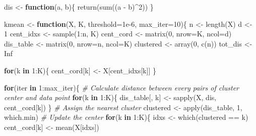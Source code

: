 \documentclass[
]{article}
\newenvironment{Shaded}{\begin{snugshade}}{\end{snugshade}}
\newcommand{\AttributeTok}[1]{\textcolor[rgb]{0.77,0.63,0.00}{#1}}
\newcommand{\CommentTok}[1]{\textcolor[rgb]{0.56,0.35,0.01}{\textit{#1}}}
\newcommand{\ConstantTok}[1]{\textcolor[rgb]{0.00,0.00,0.00}{#1}}
\newcommand{\ControlFlowTok}[1]{\textcolor[rgb]{0.13,0.29,0.53}{\textbf{#1}}}
\newcommand{\DecValTok}[1]{\textcolor[rgb]{0.00,0.00,0.81}{#1}}
\newcommand{\FloatTok}[1]{\textcolor[rgb]{0.00,0.00,0.81}{#1}}
\newcommand{\FunctionTok}[1]{\textcolor[rgb]{0.00,0.00,0.00}{#1}}
\newcommand{\NormalTok}[1]{#1}
\newcommand{\OtherTok}[1]{\textcolor[rgb]{0.56,0.35,0.01}{#1}}
\newcommand{\SpecialCharTok}[1]{\textcolor[rgb]{0.00,0.00,0.00}{#1}}
\begin{document}
\begin{Shaded}
\begin{Highlighting}[]
\NormalTok{dis }\OtherTok{\textless{}{-}} \ControlFlowTok{function}\NormalTok{(a, b)\{}
  \FunctionTok{return}\NormalTok{(}\FunctionTok{sum}\NormalTok{((a }\SpecialCharTok{{-}}\NormalTok{ b)}\SpecialCharTok{\^{}}\DecValTok{2}\NormalTok{))}
\NormalTok{\}}

\NormalTok{kmean }\OtherTok{\textless{}{-}} \ControlFlowTok{function}\NormalTok{(X, K, }\AttributeTok{threshold=}\FloatTok{1e{-}6}\NormalTok{, }\AttributeTok{max\_iter=}\DecValTok{10}\NormalTok{)\{}
\NormalTok{  n }\OtherTok{\textless{}{-}} \FunctionTok{length}\NormalTok{(X)}
\NormalTok{  d }\OtherTok{\textless{}{-}} \DecValTok{1}
\NormalTok{  cent\_idxs }\OtherTok{\textless{}{-}} \FunctionTok{sample}\NormalTok{(}\DecValTok{1}\SpecialCharTok{:}\NormalTok{n, K)}
\NormalTok{  cent\_cord }\OtherTok{\textless{}{-}} \FunctionTok{matrix}\NormalTok{(}\DecValTok{0}\NormalTok{, }\AttributeTok{nrow=}\NormalTok{K, }\AttributeTok{ncol=}\NormalTok{d)}
\NormalTok{  dis\_table }\OtherTok{\textless{}{-}} \FunctionTok{matrix}\NormalTok{(}\DecValTok{0}\NormalTok{, }\AttributeTok{nrow=}\NormalTok{n, }\AttributeTok{ncol=}\NormalTok{K)}
\NormalTok{  clustered }\OtherTok{\textless{}{-}} \FunctionTok{array}\NormalTok{(}\DecValTok{0}\NormalTok{, }\FunctionTok{c}\NormalTok{(n))}
\NormalTok{  tot\_dis }\OtherTok{\textless{}{-}} \ConstantTok{Inf}
  
  \ControlFlowTok{for}\NormalTok{(k }\ControlFlowTok{in} \DecValTok{1}\SpecialCharTok{:}\NormalTok{K)\{}
\NormalTok{    cent\_cord[k] }\OtherTok{\textless{}{-}}\NormalTok{ X[cent\_idxs[k]]}
\NormalTok{  \}}
  
  \ControlFlowTok{for}\NormalTok{(iter }\ControlFlowTok{in} \DecValTok{1}\SpecialCharTok{:}\NormalTok{max\_iter)\{}
    \CommentTok{\# Calculate distance between every pairs of cluster center and data point}
    \ControlFlowTok{for}\NormalTok{(k }\ControlFlowTok{in} \DecValTok{1}\SpecialCharTok{:}\NormalTok{K)\{}
\NormalTok{      dis\_table[, k] }\OtherTok{\textless{}{-}} \FunctionTok{sapply}\NormalTok{(X, dis, cent\_cord[k])}
\NormalTok{    \}}
    \CommentTok{\# Assign the nearest cluster}
\NormalTok{    clustered }\OtherTok{\textless{}{-}} \FunctionTok{apply}\NormalTok{(dis\_table, }\DecValTok{1}\NormalTok{, which.min)}
    \CommentTok{\# Update the center}
    \ControlFlowTok{for}\NormalTok{(k }\ControlFlowTok{in} \DecValTok{1}\SpecialCharTok{:}\NormalTok{K)\{}
\NormalTok{      idxs }\OtherTok{\textless{}{-}} \FunctionTok{which}\NormalTok{(clustered }\SpecialCharTok{==}\NormalTok{ k)}
\NormalTok{      cent\_cord[k] }\OtherTok{\textless{}{-}} \FunctionTok{mean}\NormalTok{(X[idxs])}
      

\end{Highlighting}
\end{Shaded}
\end{document}
